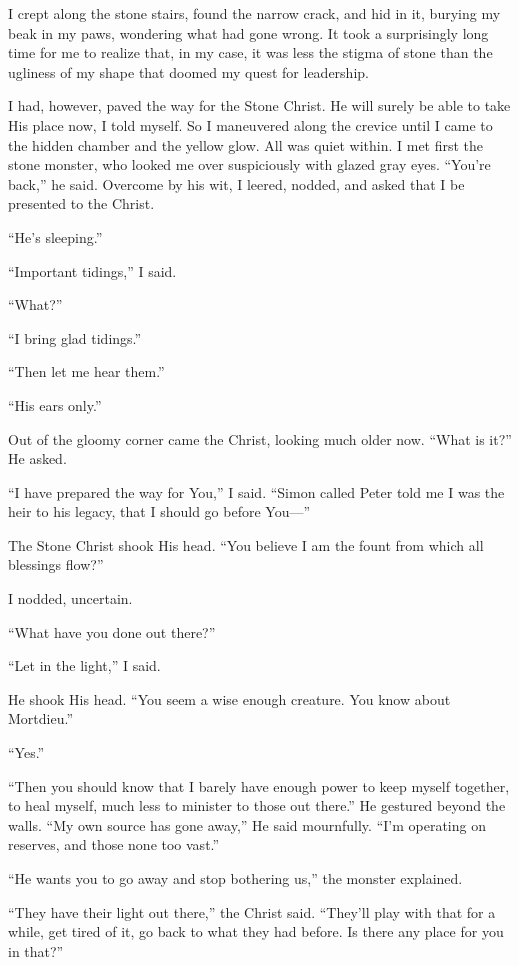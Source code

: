 I crept along the stone stairs, found the narrow crack, and hid in it, burying my beak in my paws, wondering what had gone wrong. It took a surprisingly long time for me to realize that, in my case, it was less the stigma of stone than the ugliness of my shape that doomed my quest for leadership.

I had, however, paved the way for the Stone Christ. He will surely be able to take His place now, I told myself. So I maneuvered along the crevice until I came to the hidden chamber and the yellow glow. All was quiet within. I met first the stone monster, who looked me over suspiciously with glazed gray eyes. “You’re back,” he said. Overcome by his wit, I leered, nodded, and asked that I be presented to the Christ.

“He’s sleeping.”

“Important tidings,” I said.

“What?”

“I bring glad tidings.”

“Then let me hear them.”

“His ears only.”

Out of the gloomy corner came the Christ, looking much older now. “What is it?” He asked.

“I have prepared the way for You,” I said. “Simon called Peter told me I was the heir to his legacy, that I should go before You—”

The Stone Christ shook His head. “You believe I am the fount from which all blessings flow?”

I nodded, uncertain.

“What have you done out there?”

“Let in the light,” I said.

He shook His head. “You seem a wise enough creature. You know about Mortdieu.”

“Yes.”

“Then you should know that I barely have enough power to keep myself together, to heal myself, much less to minister to those out there.” He gestured beyond the walls. “My own source has gone away,” He said mournfully. “I’m operating on reserves, and those none too vast.”

“He wants you to go away and stop bothering us,” the monster explained.

“They have their light out there,” the Christ said. “They’ll play with that for a while, get tired of it, go back to what they had before. Is there any place for you in that?”

